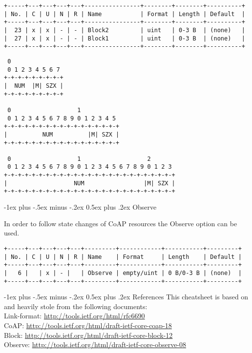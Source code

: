 \documentclass[10pt,landscape]{article}
\makeatletter
\renewcommand{\section}{\@startsection{section}{1}{0mm}%
                                {-1ex plus -.5ex minus -.2ex}%
                                {0.5ex plus .2ex}%
                                {\normalfont\large\bfseries}}
\makeatother
\begin{document}
\begin{multicols}{3}
{\tiny
\begin{verbatim}
+-----+---+---+---+---+----------------+--------+--------+----------+
| No. | C | U | N | R | Name           | Format | Length | Default  |
+-----+---+---+---+---+----------------+--------+--------+----------+
|  23 | x | x | - | - | Block2         | uint   | 0-3 B  | (none)   |
|  27 | x | x | - | - | Block1         | uint   | 0-3 B  | (none)   |
+-----+---+---+---+---+----------------+--------+--------+----------+
\end{verbatim}
}
{\tiny
\begin{verbatim}
 0
 0 1 2 3 4 5 6 7
+-+-+-+-+-+-+-+-+
|  NUM  |M| SZX |
+-+-+-+-+-+-+-+-+

 0                   1
 0 1 2 3 4 5 6 7 8 9 0 1 2 3 4 5
+-+-+-+-+-+-+-+-+-+-+-+-+-+-+-+-+
|          NUM          |M| SZX |
+-+-+-+-+-+-+-+-+-+-+-+-+-+-+-+-+

 0                   1                   2
 0 1 2 3 4 5 6 7 8 9 0 1 2 3 4 5 6 7 8 9 0 1 2 3
+-+-+-+-+-+-+-+-+-+-+-+-+-+-+-+-+-+-+-+-+-+-+-+-+
|                   NUM                 |M| SZX |
+-+-+-+-+-+-+-+-+-+-+-+-+-+-+-+-+-+-+-+-+-+-+-+-+
\end{verbatim}
}

\section{Observe}

In order to follow state changes of CoAP resources the Observe option
can be used.

{\tiny
\begin{verbatim}
+-----+---+---+---+---+---------+------------+-----------+---------+
| No. | C | U | N | R | Name    | Format     | Length    | Default |
+-----+---+---+---+---+---------+------------+-----------+---------+
|   6 |   | x | - |   | Observe | empty/uint | 0 B/0-3 B | (none)  |
+-----+---+---+---+---+---------+------------+-----------+---------+
\end{verbatim}
}

\section{References}
This cheatsheet is based on and heavily stole from the following
documents:\\

{\tiny
Link-format: \url{http://tools.ietf.org/html/rfc6690}\\
CoAP: \url{http://tools.ietf.org/html/draft-ietf-core-coap-18}\\
Block: \url{http://tools.ietf.org/html/draft-ietf-core-block-12}\\
Observe: \url{http://tools.ietf.org/html/draft-ietf-core-observe-08}\\
}
%
%
\end{multicols}
\end{document}
